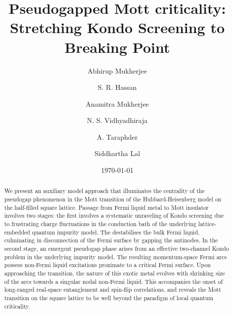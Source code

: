 \documentclass[%
 reprint,
superscriptaddress,
groupedaddress,
 amsmath,amssymb,
 aps,
prl,superscriptaddress
]{revtex4-2}
\begin{document}


\title{Pseudogapped Mott criticality: Stretching Kondo Screening to Breaking Point}


\author{Abhirup Mukherjee}
\author{S. R. Hassan}
\author{Anamitra Mukherjee}
\author{N. S. Vidhyadhiraja}
\author{A. Taraphder}
%
\author{Siddhartha Lal}

\date{\today}
\begin{abstract}
We present an auxiliary model approach that illuminates the centrality of the pseudogap phenomenon in the Mott transition of the Hubbard-Heisenberg model on the half-filled square lattice. Passage from Fermi liquid metal to Mott insulator involves two stages: the first involves a systematic unraveling of Kondo screening due to frustrating charge fluctuations in the conduction bath of the underlying lattice-embedded quantum impurity model. The destabilises the bulk Fermi liquid, culminating in disconnection of the Fermi surface by gapping the antinodes. In the second stage, an emergent pseudogap phase arises from an effective two-channel Kondo problem in the underlying impurity model. The resulting momentum-space Fermi arcs possess non-Fermi liquid excitations proximate to a critical Fermi surface. Upon approaching the transition, the nature of this exotic metal evolves with shrinking size of the arcs towards a singular nodal non-Fermi liquid. This accompanies the onset of long-ranged real-space entanglement and spin-flip correlations, and reveals the Mott transition on the square lattice to be well beyond the paradigm of local quantum criticality.
\end{abstract}
\end{document}
